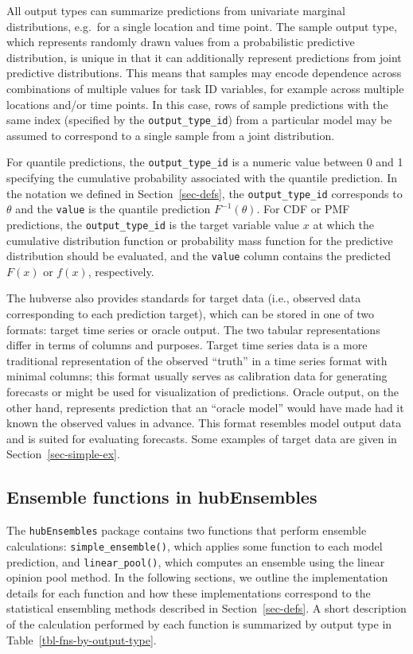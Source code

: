 \documentclass[
  letterpaper,
  DIV=11,
  numbers=noendperiod]{scrartcl}
\begin{document}
All output types can summarize predictions from univariate marginal
distributions, e.g.~for a single location and time point. The sample
output type, which represents randomly drawn values from a probabilistic
predictive distribution, is unique in that it can additionally represent
predictions from joint predictive distributions. This means that samples
may encode dependence across combinations of multiple values for task ID
variables, for example across multiple locations and/or time points. In
this case, rows of sample predictions with the same index (specified by
the \texttt{output\_type\_id}) from a particular model may be assumed to
correspond to a single sample from a joint distribution.

For quantile predictions, the \texttt{output\_type\_id} is a numeric
value between 0 and 1 specifying the cumulative probability associated
with the quantile prediction. In the notation we defined in
Section~\ref{sec-defs}, the \texttt{output\_type\_id} corresponds to
\(\theta\) and the \texttt{value} is the quantile prediction
\(F^{-1}(\theta)\). For CDF or PMF predictions, the
\texttt{output\_type\_id} is the target variable value \(x\) at which
the cumulative distribution function or probability mass function for
the predictive distribution should be evaluated, and the \texttt{value}
column contains the predicted \(F(x)\) or \(f(x)\), respectively.

The hubverse also provides standards for target data (i.e., observed
data corresponding to each prediction target), which can be stored in
one of two formats: target time series or oracle output. The two tabular
representations differ in terms of columns and purposes. Target time
series data is a more traditional representation of the observed
``truth'' in a time series format with minimal columns; this format
usually serves as calibration data for generating forecasts or might be
used for visualization of predictions. Oracle output, on the other hand,
represents prediction that an ``oracle model'' would have made had it
known the observed values in advance. This format resembles model output
data and is suited for evaluating forecasts. Some examples of target
data are given in Section~\ref{sec-simple-ex}.

\subsection{Ensemble functions in hubEnsembles}\label{sec-ens-fns}

The \texttt{hubEnsembles} package contains two functions that perform
ensemble calculations: \texttt{simple\_ensemble()}, which applies some
function to each model prediction, and \texttt{linear\_pool()}, which
computes an ensemble using the linear opinion pool method. In the
following sections, we outline the implementation details for each
function and how these implementations correspond to the statistical
ensembling methods described in Section~\ref{sec-defs}. A short
description of the calculation performed by each function is summarized
by output type in Table~\ref{tbl-fns-by-output-type}.
\end{document}
